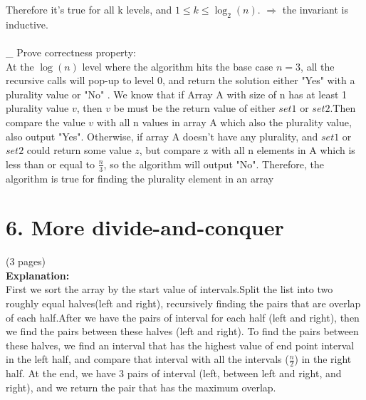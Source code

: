 \documentclass[11pt]{article}
\begin{document}
Therefore it's true for all k levels, and $1 \leqslant k \leqslant \log_2(n)$. $\Rightarrow$ the invariant is inductive.
\\
\\
\_ Prove correctness property:\\
At the $\log(n)$ level where the algorithm hits the base case $n=3$,  all the recursive calls will pop-up to level 0, and return the solution either "Yes" with a plurality value or "No" . We know that if Array A with size of n has at least 1 plurality value $v$, then $v$ be must be the return value of either $set1$ or $set2$.Then compare the value $v$ with all n values in array A which also the plurality value, also output "Yes". Otherwise, if array A doesn't have any plurality, and $set1$ or $set2$ could return some value $z$, but compare z with all n elements in A which is less than or equal to $\frac{n}{3}$, so the algorithm will output "No". Therefore, the algorithm is true for finding the plurality element in an array
\newpage
\section*{6. More divide-and-conquer} (3 pages)\\
\noindent
\textbf{Explanation:}\\
First we sort the array by the start value of intervals.Split the list into two roughly equal halves(left and right), recursively finding the pairs that are overlap of each half.After we have the pairs of interval for each half (left and right), then we find the pairs between these halves (left and right). To find the pairs between these halves, we find an interval that has the highest value of end point interval in the left half, and compare that interval with all the intervals ($\frac{n}{2}$) in the right half. At the end, we have 3 pairs of interval (left, between left and right, and right), and we return the pair that has the maximum overlap.
\\
\end{document}
